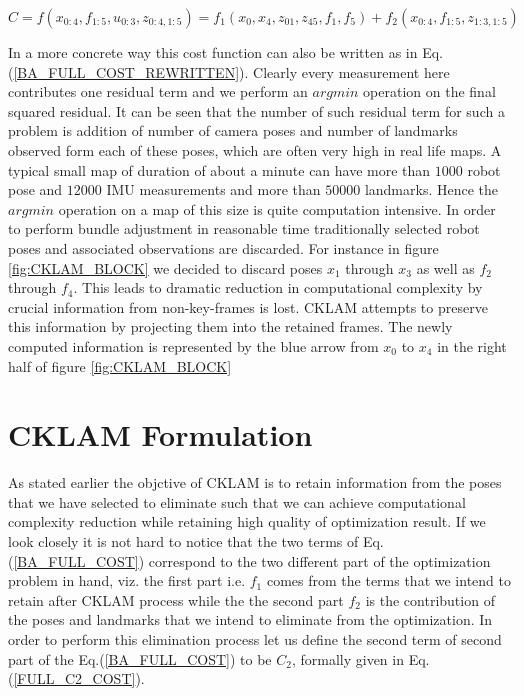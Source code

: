 \begin{equation}
  C = f(x_{0:4}, f_{1:5}, u_{0:3}, z_{0:4, 1:5}) = f_1(x_0, x_4, z_{01}, z_{45}, f_1, f_5) + f_2(x_{0:4}, f_{1:5}, z_{1:3, 1:5})
  \label{BA_FULL_COST}
\end{equation}

In a more concrete way this cost function can also be written as in Eq.(\ref{BA_FULL_COST_REWRITTEN}). Clearly every measurement here contributes one residual term and we perform an $argmin$ operation on the final squared residual. It can be seen that the number of such residual term for such a problem is addition of number of camera poses and number of landmarks observed form each of these poses, which are often very high in real life maps. A typical small map of duration of about a minute can have more than $1000$ robot pose and $12000$ IMU measurements and more than $50000$ landmarks. Hence the $argmin$ operation on a map of this size is quite computation intensive. In order to perform bundle adjustment in reasonable time traditionally selected robot poses and associated observations are discarded. For instance in figure \ref{fig:CKLAM_BLOCK} we decided to discard poses $x_1$ through $x_3$ as well as $f_2$ through $f_4$. This leads to dramatic reduction in computational complexity by crucial information from non-key-frames is lost. CKLAM attempts to preserve this information by projecting them into the retained frames. The newly computed information is represented by the blue arrow from $x_0$ to $x_4$ in the right half of figure \ref{fig:CKLAM_BLOCK}

\section{CKLAM Formulation}
As stated earlier the objctive of CKLAM is to retain information from the poses that we have selected to eliminate such that we can achieve computational complexity reduction while retaining high quality of optimization result. If we look closely it is not hard to notice that the two terms of Eq.(\ref{BA_FULL_COST}) correspond to the two different part of the optimization problem in hand, viz. the first part i.e. $f_1$ comes from the terms that we intend to retain after CKLAM process while the the second part $f_2$ is the contribution of the poses and landmarks that we intend to eliminate from the optimization. In order to perform this elimination process let us define the second term of second part of the Eq.(\ref{BA_FULL_COST}) to be $C_2$, formally given in Eq. (\ref{FULL_C2_COST}). 

